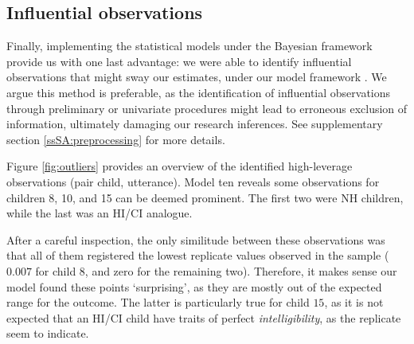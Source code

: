 \subsection{Influential observations} \label{sS:results_outliers}
%
Finally, implementing the statistical models under the Bayesian framework provide us with one last advantage: we were able to identify influential observations that might sway our estimates, under our model framework \citep{McElreath_2020}. We argue this method is preferable, as the identification of influential observations through preliminary or univariate procedures might lead to erroneous exclusion of information, ultimately damaging our research inferences. See supplementary section \ref{ssSA:preprocessing} for more details.

Figure \ref{fig:outliers} provides an overview of the identified high-leverage observations (pair child, utterance). Model ten reveals some observations for children 8, 10, and 15 can be deemed prominent. The first two were NH children, while the last was an HI/CI analogue. 

After a careful inspection, the only similitude between these observations was that all of them registered the lowest replicate values observed in the sample ($0.007$ for child 8, and zero for the remaining two). Therefore, it makes sense our model found these points `surprising', as they are mostly out of the expected range for the outcome. The latter is particularly true for child $15$, as it is not expected that an HI/CI child have traits of perfect \textit{intelligibility}, as the replicate seem to indicate. 

